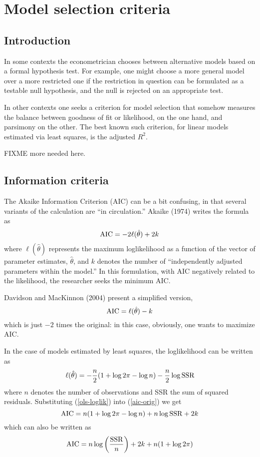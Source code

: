 \chapter{Model selection criteria}
\label{select-criteria}


\section{Introduction}
\label{select-intro}

In some contexts the econometrician chooses between alternative models
based on a formal hypothesis test.  For example, one might choose a
more general model over a more restricted one if the restriction in
question can be formulated as a testable null hypothesis, and the null
is rejected on an appropriate test.

In other contexts one seeks a criterion for model selection that
somehow measures the balance between goodness of fit or likelihood,
on the one hand, and parsimony on the other.  The best known such
criterion, for linear models estimated via least squares, is the
adjusted $R^2$.

FIXME more needed here.


\section{Information criteria}
\label{select-aic}

The Akaike Information Criterion (AIC) can be a bit confusing, in
that several variants of the calculation are ``in circulation.''
Akaike (1974) writes the formula as
%
\begin{equation}
\label{aic-orig}
{\rm AIC} = -2 \ell(\hat{\theta}) + 2k
\end{equation}
%
where $\ell(\hat{\theta})$ represents the maximum loglikelihood as a
function of the vector of parameter estimates, $\hat{\theta}$, and $k$
denotes the number of ``independently adjusted parameters within the
model.''  In this formulation, with AIC negatively related to the
likelihood, the researcher seeks the minimum AIC.

Davidson and MacKinnon (2004) present a simplified version,
%
\[
{\rm AIC} = \ell(\hat{\theta}) - k
\]
%
which is just $-2$ times the original: in this case, obviously, one
wants to maximize AIC.

In the case of models estimated by least squares, the loglikelihood
can be written as
%
\begin{equation}
\label{ols-loglik}
\ell(\hat{\theta}) = -\frac{n}{2}(1 + \log 2\pi - \log n)
 - \frac{n}{2} \log {\rm SSR}
\end{equation}
%
where $n$ denotes the number of observations and SSR the sum of
squared residuals.  Substituting (\ref{ols-loglik}) into
(\ref{aic-orig}) we get
%
\[
{\rm AIC} = n(1 + \log 2\pi - \log n) + n\log {\rm SSR} + 2k
\]
%
which can also be written as
%
\begin{equation}
\label{full-aic-alt}
{\rm AIC} = n\log \left( \frac{\rm SSR}{n} \right) + 2k + 
  n(1 + \log 2\pi)
\end{equation}
%

